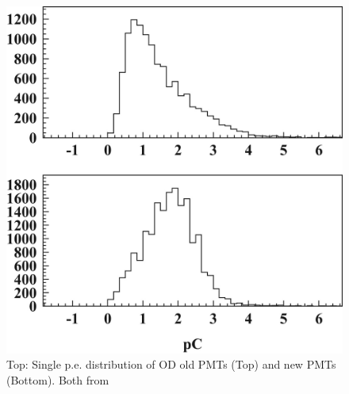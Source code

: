 \begin{figure}
\centering
\includegraphics{figures/OD_1pe_distribution.jpg}
\caption{Top: Single p.e. distribution of OD old PMTs (Top) and new PMTs (Bottom). Both from \cite{Abe:2013gga}}
\label{fig:od_1pe}
\end{figure}
 